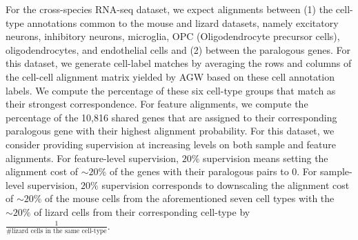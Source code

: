 For the cross-species RNA-seq dataset, we expect alignments between (1) the cell-type annotations
common to the mouse and lizard datasets, namely excitatory neurons, inhibitory neurons,
microglia, OPC (Oligodendrocyte precursor cells), oligodendrocytes, and endothelial cells
and (2) between the paralogous genes. For this dataset, we generate cell-label matches
by averaging the rows and columns of the cell-cell alignment matrix yielded by AGW based on
these cell annotation labels. We compute the percentage of these six cell-type groups that
match as their strongest correspondence. For feature alignments, we compute the percentage
of the 10,816 shared genes that are assigned to their corresponding paralogous gene with
their highest alignment probability. For this dataset, we consider providing supervision at
increasing levels on both sample and feature alignments. For feature-level supervision,
$20\%$ supervision means setting the alignment cost of $\sim 20\%$ of the genes with
their paralogous pairs to $0$. For sample-level supervision, $20\%$ supervision corresponds
to downscaling the alignment cost of $\sim 20\%$ of the mouse cells from the aforementioned
seven cell types with the $\sim 20\%$ of lizard cells from their corresponding cell-type by
$\frac{1}{\textrm{\# lizard cells in the same cell-type}}$.


